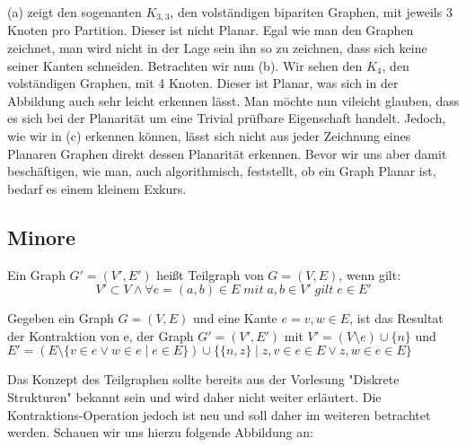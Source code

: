 \documentclass[runningheads]{llncs}
\begin{document}
(a) zeigt den sogenanten $K_{3,3}$, den
volständigen bipariten Graphen, mit jeweils 3 Knoten pro Partition. Dieser ist nicht Planar. Egal wie man den Graphen
zeichnet, man wird nicht in der Lage sein ihn so zu zeichnen, dass sich keine seiner Kanten schneiden. Betrachten wir
nun (b). Wir sehen den $K_4$, den volständigen Graphen, mit 4 Knoten. Dieser ist Planar, was sich in der Abbildung auch
sehr leicht erkennen lässt. Man möchte nun vileicht glauben, dass es sich bei der Planarität um eine Trivial prüfbare
Eigenschaft handelt. Jedoch, wie wir in (c) erkennen können, lässt sich nicht aus jeder Zeichnung eines Planaren Graphen
direkt dessen Planarität erkennen. Bevor wir uns aber damit beschäftigen, wie man, auch algorithmisch, feststellt, ob ein
Graph Planar ist, bedarf es einem kleinem Exkurs. 


\subsection{Minore}
\begin{definition}[Teilgraph]
    Ein Graph $G' = (V', E') $ heißt Teilgraph von $G = (V, E)$, wenn gilt:
    \[V' \subset V \land \forall e =(a, b) \in E \;mit\;  a,b \in V' \; gilt \; e \in E'\]
\end{definition}
\begin{definition}[Kantenkontraktion]
    Gegeben ein Graph $G = (V,E)$ und eine Kante $ e = {v, w} \in E $, ist das Resultat der Kontraktion von e, der Graph $G' = (V', E')$ mit
    $V' = (V \setminus e) \cup \{n \}$ und $E' = (E \setminus \{v \in e \lor w \in e  \mid e \in E \}) \cup \{ \{n, z\} \mid z,v \in e \in E \lor z,w \in e \in E\}$
\end{definition}
Das Konzept des Teilgraphen sollte bereits aus der Vorlesung "Diskrete Strukturen" bekannt sein und wird daher nicht weiter
erläutert. Die Kontraktions-Operation jedoch ist neu und soll daher im weiteren betrachtet werden. Schauen wir uns hierzu 
folgende Abbildung an:
\end{document}
